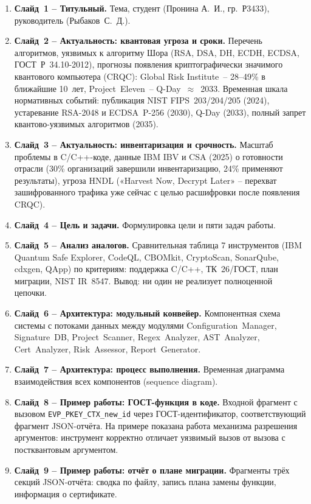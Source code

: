 \documentclass{itmo-vkr}
\begin{document}
\begin{enumerate}
    \item \textbf{Слайд~1 -- Титульный.} Тема, студент (Пронина А.~И., гр.~Р3433), руководитель (Рыбаков~С.~Д.).
    \item \textbf{Слайд~2 -- Актуальность: квантовая угроза и сроки.} Перечень алгоритмов, уязвимых к алгоритму Шора (RSA, DSA, DH, ECDH, ECDSA, ГОСТ~Р~34.10-2012), прогнозы появления криптографически значимого квантового компьютера (CRQC): Global Risk Institute~-- 28--49\% в ближайшие 10~лет, Project~Eleven~-- Q-Day~$\approx$~2033. Временная шкала нормативных событий: публикация NIST FIPS~203/204/205 (2024), устаревание RSA-2048 и ECDSA~P-256 (2030), Q-Day (2033), полный запрет квантово-уязвимых алгоритмов (2035).
    \item \textbf{Слайд~3 -- Актуальность: инвентаризация и срочность.} Масштаб проблемы в C/C++-коде, данные IBM IBV и CSA (2025) о готовности отрасли (30\% организаций завершили инвентаризацию, 24\% применяют результаты), угроза HNDL («Harvest Now, Decrypt Later» -- перехват зашифрованного трафика уже сейчас с целью расшифровки после появления CRQC).
    \item \textbf{Слайд~4 -- Цель и задачи.} Формулировка цели и пяти задач работы.
    \item \textbf{Слайд~5 -- Анализ аналогов.} Сравнительная таблица 7 инструментов (IBM Quantum Safe Explorer, CodeQL, CBOMkit, CryptoScan, SonarQube, cdxgen, QApp) по критериям: поддержка C/C++, ТК~26/ГОСТ, план миграции, NIST IR~8547. Вывод: ни один не реализует полноценной цепочки.
    \item \textbf{Слайд~6 -- Архитектура: модульный конвейер.} Компонентная схема системы с потоками данных между модулями Configuration~Manager, Signature~DB, Project~Scanner, Regex~Analyzer, AST~Analyzer, Cert~Analyzer, Risk~Assessor, Report~Generator.
    \item \textbf{Слайд~7 -- Архитектура: процесс выполнения.} Временная диаграмма взаимодействия всех компонентов (sequence diagram).
    \item \textbf{Слайд~8 -- Пример работы: ГОСТ-функция в коде.} Входной фрагмент с вызовом \texttt{EVP\_PKEY\_CTX\_new\_id} через ГОСТ-идентификатор, соответствующий фрагмент JSON-отчёта. На примере показана работа механизма разрешения аргументов: инструмент корректно отличает уязвимый вызов от вызова с постквантовым аргументом.
    \item \textbf{Слайд~9 -- Пример работы: отчёт о плане миграции.} Фрагменты трёх секций JSON-отчёта: сводка по файлу, запись плана замены функции, информация о сертификате.

\end{enumerate}
\end{document}
